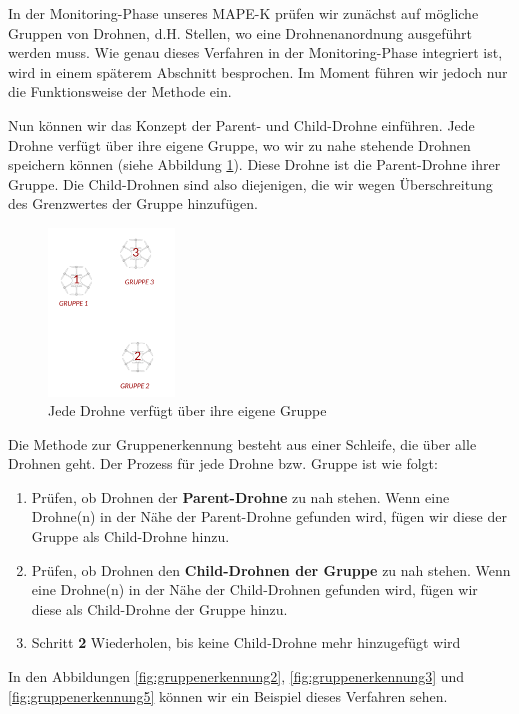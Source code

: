 \documentclass[a4paper,titlepage,onecolumn,twoside,12pt]{article}
\begin{document}
In der Monitoring-Phase unseres MAPE-K prüfen wir zunächst auf mögliche Gruppen von Drohnen, d.H. Stellen, wo eine Drohnenanordnung ausgeführt werden muss.  Wie genau dieses Verfahren in der Monitoring-Phase integriert ist, wird in einem späterem Abschnitt besprochen. Im Moment führen wir jedoch nur die Funktionsweise der Methode ein.

Nun können wir das Konzept der Parent- und Child-Drohne einführen. Jede Drohne verfügt über ihre eigene Gruppe, wo wir zu nahe stehende Drohnen speichern können (siehe Abbildung \ref{fig:gruppenerkennung1}). Diese Drohne ist die Parent-Drohne ihrer Gruppe. Die Child-Drohnen sind also diejenigen, die wir wegen Überschreitung des Grenzwertes der Gruppe hinzufügen.

\begin{figure}
\centering
\includegraphics[width = 0.3\textwidth]{gruppenerkennung1}
\caption{Jede Drohne verfügt über ihre eigene Gruppe}
\label{fig:gruppenerkennung1}
\end{figure}

Die Methode zur Gruppenerkennung besteht aus einer Schleife, die über alle Drohnen geht. Der Prozess für jede Drohne bzw. Gruppe ist wie folgt:


\begin{enumerate}
\item Prüfen, ob Drohnen der \textbf{Parent-Drohne} zu nah stehen. Wenn eine Drohne(n) in der Nähe der Parent-Drohne gefunden wird, fügen wir diese der Gruppe als Child-Drohne hinzu.
\item Prüfen, ob Drohnen den \textbf{Child-Drohnen der Gruppe} zu nah stehen. Wenn eine Drohne(n) in der Nähe der Child-Drohnen gefunden wird, fügen wir diese als Child-Drohne der Gruppe hinzu. 
\item Schritt \textbf{2} Wiederholen, bis keine Child-Drohne mehr hinzugefügt wird
\end{enumerate}

In den Abbildungen \ref{fig:gruppenerkennung2}, \ref{fig:gruppenerkennung3} und \ref{fig:gruppenerkennung5} können wir ein Beispiel dieses Verfahren sehen.
\end{document}
